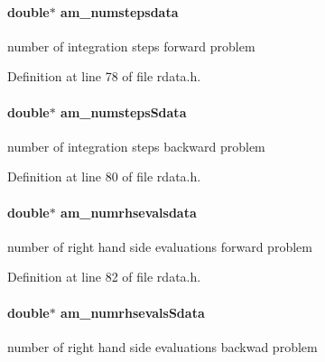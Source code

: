 \paragraph[{am\+\_\+numstepsdata}]{\setlength{\rightskip}{0pt plus 5cm}double$\ast$ am\+\_\+numstepsdata}\label{struct_return_data_a2ebada170b4bc6a2337794e4ec08d77c}
number of integration steps forward problem 

Definition at line 78 of file rdata.\+h.

\hypertarget{struct_return_data_a6852d3762d59842903ef737ed511dc43}{}
\paragraph[{am\+\_\+numsteps\+Sdata}]{\setlength{\rightskip}{0pt plus 5cm}double$\ast$ am\+\_\+numsteps\+Sdata}\label{struct_return_data_a6852d3762d59842903ef737ed511dc43}
number of integration steps backward problem 

Definition at line 80 of file rdata.\+h.

\hypertarget{struct_return_data_a480d4eb0a1a568f64b8e939105a0b627}{}
\paragraph[{am\+\_\+numrhsevalsdata}]{\setlength{\rightskip}{0pt plus 5cm}double$\ast$ am\+\_\+numrhsevalsdata}\label{struct_return_data_a480d4eb0a1a568f64b8e939105a0b627}
number of right hand side evaluations forward problem 

Definition at line 82 of file rdata.\+h.

\hypertarget{struct_return_data_a77e958126968de6f5ee3bd1d22129641}{}
\paragraph[{am\+\_\+numrhsevals\+Sdata}]{\setlength{\rightskip}{0pt plus 5cm}double$\ast$ am\+\_\+numrhsevals\+Sdata}\label{struct_return_data_a77e958126968de6f5ee3bd1d22129641}
number of right hand side evaluations backwad problem 

